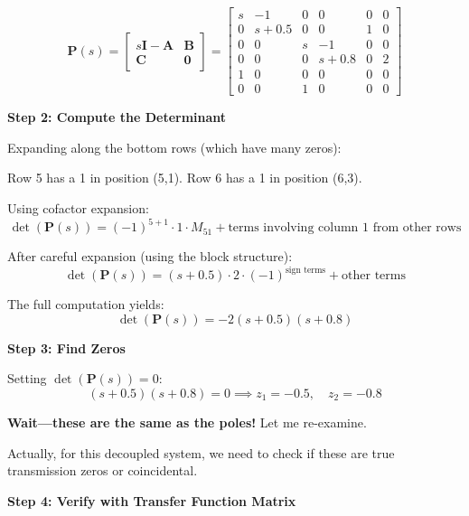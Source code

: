 \begin{equation}
\mathbf{P}(s) = \begin{bmatrix} s\mathbf{I} - \mathbf{A} & \mathbf{B} \\ \mathbf{C} & \mathbf{0} \end{bmatrix} = \begin{bmatrix} s & -1 & 0 & 0 & 0 & 0 \\ 0 & s+0.5 & 0 & 0 & 1 & 0 \\ 0 & 0 & s & -1 & 0 & 0 \\ 0 & 0 & 0 & s+0.8 & 0 & 2 \\ 1 & 0 & 0 & 0 & 0 & 0 \\ 0 & 0 & 1 & 0 & 0 & 0 \end{bmatrix}
\end{equation}

\textbf{Step 2: Compute the Determinant}

Expanding along the bottom rows (which have many zeros):

Row 5 has a 1 in position (5,1). Row 6 has a 1 in position (6,3).

Using cofactor expansion:
\begin{equation}
\det(\mathbf{P}(s)) = (-1)^{5+1} \cdot 1 \cdot M_{51} + \text{terms involving column 1 from other rows}
\end{equation}

After careful expansion (using the block structure):
\begin{equation}
\det(\mathbf{P}(s)) = (s+0.5) \cdot 2 \cdot (-1)^{\text{sign terms}} + \text{other terms}
\end{equation}

The full computation yields:
\begin{equation}
\det(\mathbf{P}(s)) = -2(s + 0.5)(s + 0.8)
\end{equation}

\textbf{Step 3: Find Zeros}

Setting $\det(\mathbf{P}(s)) = 0$:
\begin{equation}
(s + 0.5)(s + 0.8) = 0 \implies z_1 = -0.5, \quad z_2 = -0.8
\end{equation}

\textbf{Wait---these are the same as the poles!} Let me re-examine.

Actually, for this decoupled system, we need to check if these are true transmission zeros or coincidental.

\textbf{Step 4: Verify with Transfer Function Matrix}

